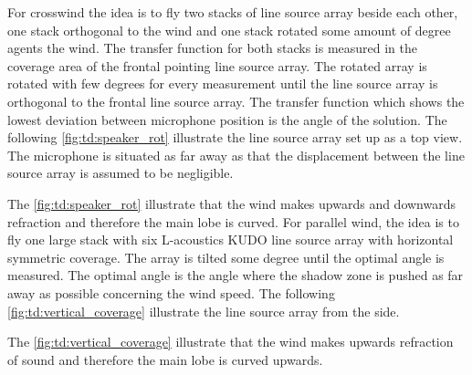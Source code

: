 For crosswind the idea is to fly two stacks of line source array beside each other, one stack orthogonal to the wind and one stack rotated some amount of degree agents the wind. The transfer function for both stacks is measured in the coverage area of the frontal pointing line source array. The rotated array is rotated with few degrees for every measurement until the line source array is orthogonal to the frontal line source array. The transfer function which shows the lowest deviation between microphone position is the angle of the solution. The following \autoref{fig:td:speaker_rot} illustrate the line source array set up as a top view. The microphone is situated as far away as that the displacement between the line source array is assumed to be negligible.


The \autoref{fig:td:speaker_rot} illustrate that the wind makes upwards and downwards refraction and therefore the main lobe is curved. For parallel wind, the idea is to fly one large stack with six L-acoustics KUDO line source array with horizontal symmetric coverage. The array is tilted some degree until the optimal angle is measured. The optimal angle is the angle where the shadow zone is pushed as far away as possible concerning the wind speed. The following \autoref{fig:td:vertical_coverage} illustrate the line source array from the side.

   

The \autoref{fig:td:vertical_coverage} illustrate that the wind makes upwards refraction of sound and therefore the main lobe is curved upwards.


